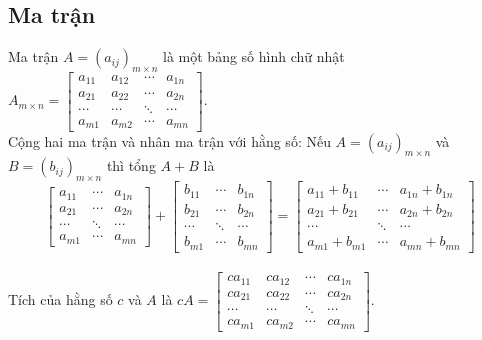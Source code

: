 \documentclass[12pt,a4paper]{report}
\begin{document}
	\subsection{Ma trận}
	Ma trận $A = (a_{ij})_{m \times n}$ là một bảng số hình chữ nhật $A_{m \times n} = \begin{bmatrix}
	a_{11}&a_{12}&\cdots&a_{1n}\\
	a_{21}&a_{22}&\cdots&a_{2n}\\
	\cdots&\cdots&\ddots&\cdots\\
	a_{m1}&a_{m2}&\cdots&a_{mn}
	\end{bmatrix}$.\\ Cộng hai ma trận và nhân ma trận với hằng số: Nếu $A = (a_{ij})_{m \times n}$ và $B = (b_{ij})_{m \times n}$ thì tổng $A + B$ là 
	$$\begin{bmatrix}
	a_{11}&\cdots&a_{1n}\\
	a_{21}&\cdots&a_{2n}\\
	\cdots&\ddots&\cdots\\
	a_{m1}&\cdots&a_{mn}
	\end{bmatrix} + \begin{bmatrix}
	b_{11}&\cdots&b_{1n}\\
	b_{21}&\cdots&b_{2n}\\
	\cdots&\ddots&\cdots\\
	b_{m1}&\cdots&b_{mn}\end{bmatrix} = \begin{bmatrix}
	a_{11} + b_{11}&\cdots&a_{1n} + b_{1n}\\
	a_{21} + b_{21}&\cdots&a_{2n} + b_{2n}\\
	\cdots&\ddots&\cdots\\
	a_{m1} + b_{m1}&\cdots&a_{mn} + b_{mn}
	\end{bmatrix}$$ \\Tích của hằng số  $c$ và $A$ là $cA = \begin{bmatrix}
	ca_{11}&ca_{12}&\cdots&ca_{1n}\\
	ca_{21}&ca_{22}&\cdots&ca_{2n}\\
	\cdots&\cdots&\ddots&\cdots\\
	ca_{m1}&ca_{m2}&\cdots&ca_{mn}
	\end{bmatrix} $.
	
\end{document}
